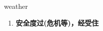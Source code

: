 
\begin{frame}
{\huge weather}
\begin{center}
\begin{enumerate}\Large
  \item \textbf{安全度过(危机等)，经受住}
\end{enumerate}
\end{center}
\end{frame}
